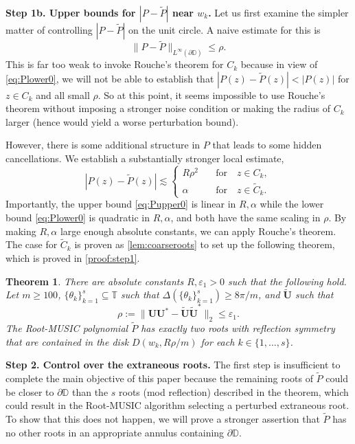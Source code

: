 \documentclass[11pt]{article}
\newtheorem{theorem}{Theorem}
\theoremstyle{definition}
\numberwithin{theorem}{section}
\numberwithin{equation}{section}
\def\D{\mathbb{D}}
\def\T{\mathbb{T}}
\renewcommand{\subset}{\subseteq}
\renewcommand{\tilde}{\widetilde}
\renewcommand{\epsilon}{\varepsilon}
\newcommand{\bfU}{{\boldsymbol U}}
\def\forspace{\quad\text{for}\quad}
\numberwithin{equation}{section}
\begin{document}
{\bf Step 1b. Upper bounds for $|P-\tilde P|$ near $w_k$.} Let us first examine the simpler matter of controlling $|P-\tilde P|$ on the unit circle. A naive estimate for this is 
$$
\|P-\tilde P\|_{L^\infty(\partial \D)}
\leq \rho.
$$
This  is far too weak to invoke Rouche's theorem for $C_k$ because in view of \eqref{eq:Plower0}, we will not be able to establish that $|P(z)-\tilde P(z)| < |P(z)|$ for $z\in C_k$ and all small $\rho$. So at this point, it seems impossible to use Rouche's theorem without imposing a stronger noise condition or making the radius of $C_k$ larger (hence would yield a worse perturbation bound). 

However, there is some additional structure in $P$ that leads to some hidden cancellations. We establish a substantially stronger local estimate,
\begin{equation}
    \label{eq:Pupper0}
    |P(z)-\tilde P(z)|\lesssim \begin{cases}
        R\rho^2 &\forspace z\in C_k,\\
        \alpha &\forspace z\in \tilde C_k.
    \end{cases}
\end{equation}
Importantly, the upper bound \eqref{eq:Pupper0} is linear in $R, \alpha$ while the lower bound \eqref{eq:Plower0} is quadratic in $R, \alpha$, and both have the same scaling in $\rho$. By making $R, \alpha$ large enough absolute constants, we can apply Rouche's theorem. The case for $\tilde C_k$ is proven as \cref{lem:coarseroots} to set up the following theorem, which is proved in \cref{proof:step1}. 


\begin{theorem}
	\label{thm:step1}
	There are absolute constants $R,\epsilon_1>0$ such that the following hold. Let $m\geq 100$, $\{\theta_k\}_{k=1}^s\subset\T$ such that $\Delta(\{\theta_k\}_{k=1}^s)\geq 8\pi/m$, and $\tilde\bfU$ such that 
    $$
    \rho:=\|\bfU\bfU^*-\tilde\bfU\tilde\bfU^*\|_2\leq \epsilon_1.
    $$
    The Root-MUSIC polynomial $\tilde P$ has exactly two roots with reflection symmetry that are contained in the disk $D(w_k,R\rho/m)$ for each $k\in \{1,\dots,s\}$. 
\end{theorem}

{\bf Step 2. Control over the extraneous roots.} The first step is insufficient to complete the main objective of this paper because the remaining roots of $\tilde P$ could be closer to $\partial\D$ than the $s$ roots (mod reflection) described in the theorem, which could result in the Root-MUSIC algorithm selecting a perturbed extraneous root. To show that this does not happen, we will prove a stronger assertion that $\tilde P$ has no other roots in an appropriate annulus containing $\partial \D$.
\end{document}
